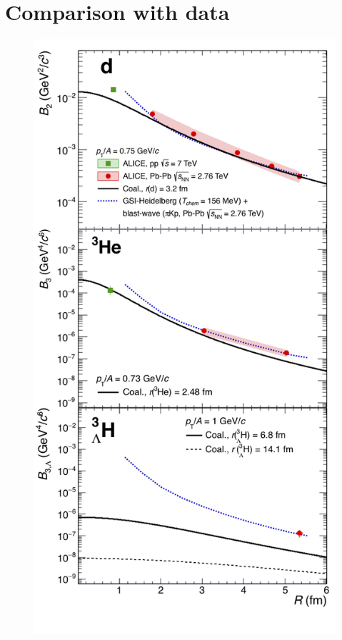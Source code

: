 \documentclass[%
 reprint,
 amsmath,amssymb,
 aps,
]{revtex4-1}
\begin{document}
\section{Comparison with data}\label{sec:results}

\begin{figure}[!h]
	\begin{center}
		\includegraphics[width=.95\columnwidth]{compareThermalAndCoalescence.png}

\end{center}
\end{figure}
\end{document}
